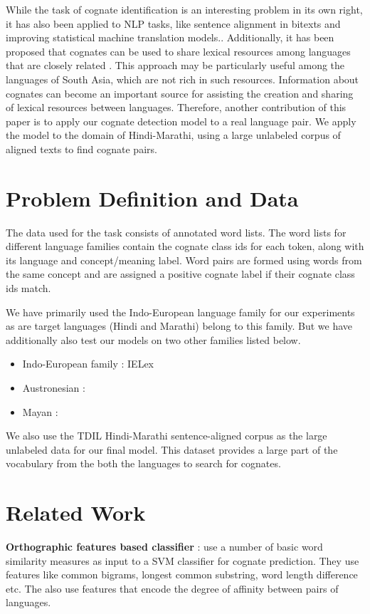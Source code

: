 \documentclass[11pt,letterpaper]{article}
\begin{document}
While the task of cognate identification is an interesting problem in its own right, it has also been applied to NLP tasks, like sentence alignment in bitexts and improving statistical machine translation models.\cite{Kondrak:2003,Simard:1993:UCA:962367.962411}. Additionally, it has been proposed that cognates can be used to share lexical resources among languages that are closely related \citep{Singh:07b}. This approach may be particularly useful among the languages of South Asia, which are not rich in such resources. Information about cognates can become an important source for assisting the creation and sharing of lexical resources between languages. Therefore, another contribution of this paper is to apply our cognate detection model to a real language pair. We apply the model to the domain of Hindi-Marathi, using a large unlabeled corpus of aligned texts to find cognate pairs.



\section{Problem Definition and Data}

The data used for the task consists of annotated word lists. The word lists for different language families contain the cognate class ids for each token, along with its language and concept/meaning label. Word pairs are formed using words from the same concept and are assigned a positive cognate label if their cognate class ids match.

We have primarily used the Indo-European language family for our experiments as are target languages (Hindi and Marathi) belong to this family. But we have additionally also test our models on two other families listed below.

\begin{itemize}
\item Indo-European family : IELex
\item Austronesian :
\item Mayan :
\end{itemize}

We also use the TDIL Hindi-Marathi sentence-aligned corpus as the large unlabeled data for our final model. This dataset provides a large part of the vocabulary from the both the languages to search for cognates.

\section{Related Work}
\textbf{Orthographic features based classifier} : \citet{hauer2011clustering} use a number of basic word similarity measures as input to a SVM classifier for cognate prediction. They use features like common bigrams, longest common substring, word length difference etc. The also use features that encode the degree of affinity between pairs of languages.
\end{document}

